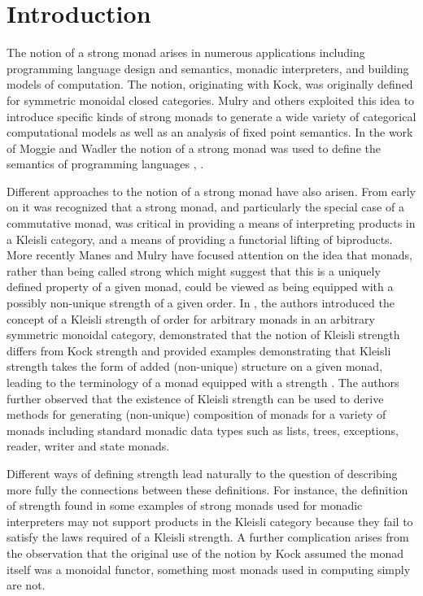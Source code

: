 \documentclass[submission,copyright]{eptcs}
\begin{document}
\section{Introduction}
The notion of a strong monad arises in numerous applications including programming language design and semantics, monadic interpreters, and building models of computation. The notion, originating with Kock\cite{articleB}, was originally defined for symmetric monoidal closed categories. Mulry and others exploited this idea to introduce specific kinds of strong monads to generate a wide variety of categorical computational models as well as an analysis of fixed point semantics\cite{articleM}.  In the work of Moggie and Wadler the notion of a strong monad was used to define the semantics of programming languages \cite{articleI}, \cite{articleL}. 

Different approaches to the notion of a strong monad have also arisen. From early on it was recognized that a strong monad, and particularly the special case of a commutative monad, was critical in providing a means of interpreting products in a Kleisli category, and a means of providing a functorial lifting of biproducts. More recently Manes and Mulry have focused attention on the idea that monads, rather than being called strong which might suggest that this is a uniquely defined property of a given monad, could be viewed as being equipped with a possibly non-unique strength of a given order. In  \cite{articleD}, the authors introduced the concept of a Kleisli strength of order  for arbitrary  monads in an arbitrary symmetric monoidal category, demonstrated that the notion of Kleisli strength differs from Kock strength and provided examples demonstrating that Kleisli strength takes the form of added (non-unique) structure on a given monad, leading to the terminology of a monad equipped with a strength . The authors further observed that the existence of Kleisli strength can be used to derive methods for generating (non-unique) composition of monads for a variety of monads including standard monadic data types such as lists, trees, exceptions, reader, writer and state monads.

Different ways of defining strength lead naturally to the question of describing more fully the connections between these definitions. For instance, the definition of strength found in some examples of strong monads used for monadic interpreters may not support products in the Kleisli category because they fail to satisfy the laws required of a Kleisli strength. A further complication arises from the observation that the original use of the notion by Kock assumed the monad itself was a monoidal functor, something most monads used in computing simply are not. 
\end{document}
